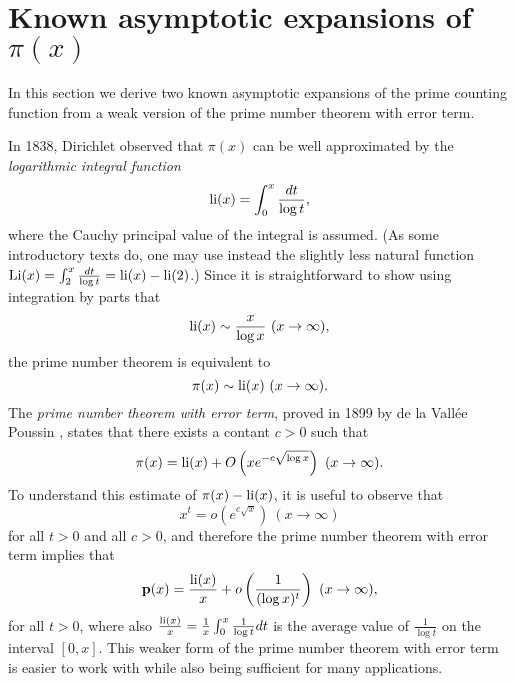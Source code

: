 \documentclass[12pt]{article}
\begin{document}
\section{Known asymptotic expansions of $\pi(x)$}

In this section we derive two known asymptotic expansions of the prime counting function from a weak version of the prime number theorem with error term.

In 1838,  Dirichlet observed that $\pi(x)$ can be well approximated by the {\it logarithmic integral function} 
$$\operatorname{li}(x) = \int_0^x \frac{dt}{\log t},$$
where the Cauchy principal value of the integral is assumed.   (As some introductory texts do, one may use instead the slightly less natural function $\operatorname{Li}(x) = \int_2^x \frac{dt}{\log t}  = \operatorname{li}(x)-\operatorname{li}(2)$.)  Since it is straightforward to show using integration by parts that 
$$\operatorname{li}(x) \sim \frac{x}{\log x} \ (x \to \infty),$$
the prime number theorem is equivalent to
$$\pi(x) \sim \operatorname{li}(x) \ (x \to \infty).$$
The {\it prime number theorem with error term}, proved  in 1899 by de la Vall\'ee Poussin \cite{val2}, states that there exists a contant $c > 0$ such that
$$\pi(x) = \operatorname{li}(x) + O\left(xe^{-c\sqrt{\log x}} \right) \ (x \to \infty).$$
To understand this estimate of $\pi(x)-\operatorname{li}(x)$, it is useful to observe that
$$x^{t} = o( e^{c\sqrt{x}})  \ (x \to  \infty)$$
for all $t>0$ and all $c > 0$, and therefore  the prime number theorem with error term implies that
\begin{align}\label{PNTET}
{\mathbf p}(x) = \frac{\operatorname{li}(x)}{x} + o\left(\frac{1}{(\log x)^{t}}\right) \ (x \to \infty),
\end{align}
for all $t > 0$, where also $\frac{\operatorname{li}(x)}{x}  = \frac{1}{x}\int_0^x \frac{1}{\log t} dt$ is the average value of $\frac{1}{\log t}$ on the interval $[0,x]$.  This weaker form of the  prime number theorem with error term is easier to work with while also being sufficient for many applications.  
\end{document}
